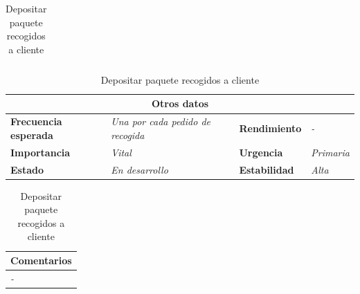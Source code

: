 \documentclass[12pt,spanish]{article}
\begin{document}
\begin{table}[H]
\begin{tabular}{|m{5pt}|m{7.33cm}|m{5pt}|m{7.33cm}|}
	\end{tabular}

	
	\vspace{0.5cm}
	
	\begin{tabular}{|m{3.75cm}|m{3.75cm}|m{3.75cm}|m{3.8cm}|}
		\hline
		\multicolumn{4}{|c|}{\textbf{Otros datos}} \\
		\hline
		\textbf{Frecuencia esperada} & \textit{Una por cada pedido de recogida} & \textbf{Rendimiento} & \textit{-} \\
		\hline
		\textbf{Importancia} & \textit{Vital} & \textbf{Urgencia} & \textit{Primaria} \\
		\hline
		\textbf{Estado} & \textit{En desarrollo} & \textbf{Estabilidad} & \textit{Alta} \\
		\hline
	\end{tabular}
	
	\vspace{1cm}
	
	\begin{tabular}{|m{16.2cm}|}
		\hline
		\textbf{Comentarios} \\
		\hline
		\textit{-} \\
		\hline
	\end{tabular}
	
	\caption{Depositar paquete recogidos a cliente}

\end{table}
\end{document}
